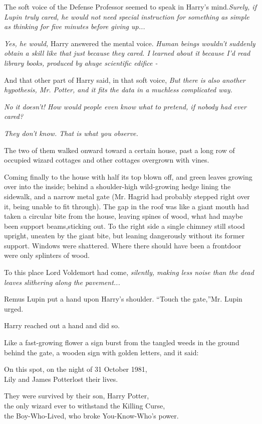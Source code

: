 The soft voice of the Defense Professor seemed to speak in Harry's mind.\emph{Surely, if Lupin truly cared, he would not need special instruction for something as simple as thinking for five minutes before giving up...}

\emph{Yes, he would,} Harry answered the mental voice. \emph{Human beings wouldn't suddenly obtain a skill like that just because they cared. I learned about it because I'd read library books, produced by ahuge scientific edifice -}

And that other part of Harry said, in that soft voice, \emph{But there is also another hypothesis, Mr. Potter, and it fits the data in a muchless complicated way.}

\emph{No it doesn't! How would people even know what to pretend, if nobody had ever cared?}

\emph{They don't know. That is what you observe.}

The two of them walked onward toward a certain house, past a long row of occupied wizard cottages and other cottages overgrown with vines.

Coming finally to the house with half its top blown off, and green leaves growing over into the inside; behind a shoulder-high wild-growing hedge lining the sidewalk, and a narrow metal gate (Mr. Hagrid had probably stepped right over it, being unable to fit through). The gap in the roof was like a giant mouth had taken a circular bite from the house, leaving spines of wood, what had maybe been support beams,sticking out. To the right side a single chimney still stood upright, uneaten by the giant bite, but leaning dangerously without its former support. Windows were shattered. Where there should have been a frontdoor were only splinters of wood.

To this place Lord Voldemort had come, \emph{silently, making less noise than the dead leaves slithering along the pavement...}

Remus Lupin put a hand upon Harry's shoulder. “Touch the gate,”Mr. Lupin urged.

Harry reached out a hand and did so.

Like a fast-growing flower a sign burst from the tangled weeds in the ground behind the gate, a wooden sign with golden letters, and it said:

On this spot, on the night of 31 October 1981,\\ Lily and James Potterlost their lives.

They were survived by their son, Harry Potter,\\ the only wizard ever to withstand the Killing Curse,\\ the Boy-Who-Lived, who broke You-Know-Who's power.


